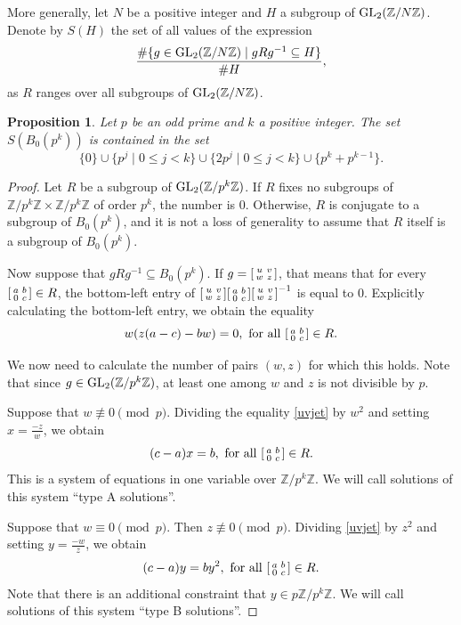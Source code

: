 \documentclass[10pt,leqno]{amsart}
\newcommand\sm[1]{\begin{bsmallmatrix}#1\end{bsmallmatrix}}
\newcommand{\Z}{\mathbb{Z}}
\newcommand{\GL}{\textnormal{GL}}
\newtheorem{proposition}[theorem]{Proposition}
\theoremstyle{definition}
\theoremstyle{remark}
\numberwithin{theorem}{section}
\begin{document}
More generally, let $N$ be a positive integer and $H$ a subgroup of $\GL_2(\Z/N\Z)$. Denote by $S(H)$ the set of all values of the expression $$\frac{\#\{g \in \GL_2(\Z/N\Z) \mid gRg^{-1} \subseteq H\} }{\#H},$$
as $R$ ranges over all subgroups of $\GL_2(\Z/N\Z)$.
\begin{proposition}\label{neparno}
    Let $p$ be an odd prime and $k$ a positive integer. The set $S(B_0(p^k))$ is contained in the set $$\{0\} \cup \{p^j \mid 0\leq j <k\}\cup \{2p^j \mid 0\leq j <k\}\cup \{p^k+p^{k-1}\}.$$ 
\end{proposition}
\begin{proof}
    Let $R$ be a subgroup of $\GL_2(\Z/p^k\Z)$. If $R$ fixes no subgroups of $\Z/p^k\Z \times \Z/p^k\Z$ of order $p^k$, the number is $0$. Otherwise, $R$ is conjugate to a subgroup of $B_0(p^k)$, and it is not a loss of generality to assume that $R$ itself is a subgroup of $B_0(p^k)$.

    Now suppose that $gRg^{-1} \subseteq B_0(p^k)$. If $g=\sm{u & v \\ w & z}$, that means that for every $\sm{a & b \\ 0 & c}\in R$, the bottom-left entry of $\sm{u & v \\ w & z}\sm{a & b \\ 0 & c}\sm{u & v \\ w & z}^{-1}$ is equal to $0$. Explicitly calculating the bottom-left entry, we obtain the equality \begin{equation}\label{uvjet} w(z(a-c)-bw)=0, \ \text{for all } \sm{a & b \\ 0 & c}\in R.\end{equation}

    We now need to calculate the number of pairs $(w,z)$ for which this holds. Note that since $g \in \GL_2(\Z/p^k\Z)$, at least one among $w$ and $z$ is not divisible by $p$.

    Suppose that $w\not \equiv 0 \pmod{p}$. Dividing the equality \eqref{uvjet} by $w^2$ and setting $x=\frac{-z}{w}$, we obtain $$(c-a)x=b, \text{ for all } \sm{a & b \\0 & c } \in R.$$
    This is a system of equations in one variable over $\Z/p^k\Z$. We will call solutions of this system ``type A solutions''.

    Suppose that $w\equiv 0 \pmod p$. Then $z\not \equiv 0 \pmod p$. Dividing \cref{uvjet} by $z^2$ and setting $y=\frac{-w}{z}$, we obtain 
    $$(c-a)y=by^2, \text{ for all } \sm{a & b \\0 & c } \in R.$$
    Note that there is an additional constraint that $y\in p\Z/p^k\Z$. We will call solutions of this system ``type B solutions''.


\end{proof}
\end{document}
